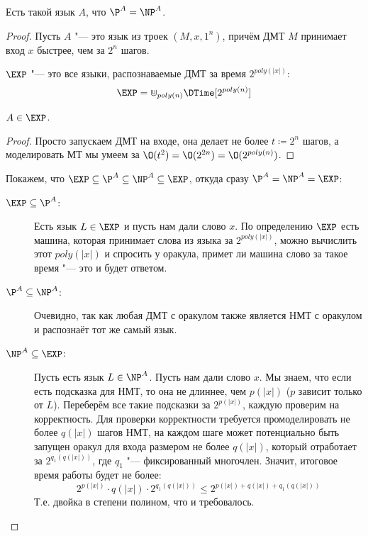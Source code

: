 	\begin{theorem}
		Есть такой язык $A$, что $\P^A = \NP^A$.
	\end{theorem}
	\begin{proof}
		Пусть $A$ "--- это язык из троек $(M, x, 1^n)$, причём ДМТ $M$ принимает вход $x$ быстрее, чем за $2^n$ шагов.
		\begin{Def}
			$\EXP$ "--- это все языки, распознаваемые ДМТ за время $2^{poly(|x|)}$:
			\[ \EXP = \Cup_{poly(n)} \DTime[2^{poly(n)}] \]
		\end{Def}
		\begin{assertion}
			$A \in \EXP$.
		\end{assertion}
		\begin{proof}
			Просто запускаем ДМТ на входе, она делает не более $t\coloneq 2^n$ шагов, а моделировать МТ мы умеем
			за $\O(t^2)=\O(2^{2n})=\O(2^{poly(n)})$.
		\end{proof}
		Покажем, что $\EXP \subseteq \P^A \subseteq \NP^A \subseteq \EXP$, откуда сразу $\P^A=\NP^A=\EXP$:
		\begin{description}
			\item[$\EXP\subseteq \P^A$:]
				Есть язык $L \in \EXP$ и пусть нам дали слово $x$.
				По определению $\EXP$ есть машина, которая принимает слова из языка за $2^{poly(|x|)}$, можно вычислить этот $poly(|x|)$
				и спросить у оракула, примет ли машина слово за такое время "--- это и будет ответом.
			\item[$\P^A\subseteq \NP^A$:]
				Очевидно, так как любая ДМТ с оракулом также является НМТ с оракулом и распознаёт тот же самый язык.
			\item[$\NP^A\subseteq \EXP$:]
				Пусть есть язык $L \in \NP^A$.
				Пусть нам дали слово $x$.
				Мы знаем, что если есть подсказка для НМТ, то она не длиннее, чем $p(|x|)$ ($p$ зависит только от $L$).
				Переберём все такие подсказки за $2^{p(|x|)}$, каждую проверим на корректность.
				Для проверки корректности требуется промоделировать не более $q(|x|)$ шагов НМТ, на каждом шаге может потенциально
				быть запущен оракул для входа размером не более $q(|x|)$, который отработает за $2^{q_1(q(|x|))}$, где $q_1$ "--- фиксированный многочлен.
				Значит, итоговое время работы будет не более:
				\[
					2^{p(|x|)} \cdot q(|x|) \cdot 2^{q_1(q(|x|))} \le
					2^{p(|x|)+q(|x|)+q_1(q(|x|))}
				\]
				Т.е. двойка в степени полином, что и требовалось.
		\end{description}
	\end{proof}

